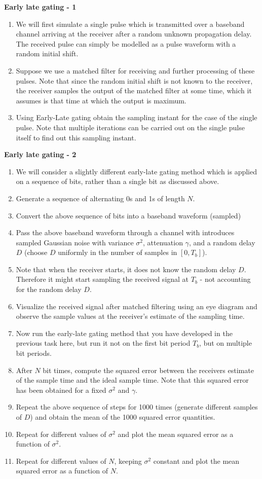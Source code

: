 \myhrule
\noindent
\textbf{Early late gating - 1}
\begin{enumerate}
\item We will first simulate a single pulse which is transmitted over a baseband channel arriving at the receiver after a random unknown propagation delay. The received pulse can simply be modelled as a pulse waveform with a random initial shift.
\item Suppose we use a matched filter for receiving and further processing of these pulses. Note that since the random initial shift is not known to the receiver, the receiver samples the output of the matched filter at some time, which it assumes is that time at which the output is maximum.
\item Using Early-Late gating obtain the sampling instant for the case of the single pulse. Note that multiple iterations can be carried out on the single pulse itself to find out this sampling instant.
\end{enumerate}

\myhrule
\noindent
\textbf{Early late gating - 2}
\begin{enumerate}
\item We will consider a slightly different early-late gating method which is applied on a sequence of bits, rather than a single bit as discussed above.
\item Generate a sequence of alternating 0s and 1s of length $N$.
\item Convert the above sequence of bits into a baseband waveform (sampled)
\item Pass the above baseband waveform through a channel with introduces sampled Gaussian noise with variance $\sigma^{2}$, attenuation $\gamma$, and a random delay $D$ (choose $D$ uniformly in the number of samples in $[0, T_{b}]$).
\item Note that when the receiver starts, it does not know the random delay $D$. Therefore it might start sampling the received signal at $T_{b}$ - not accounting for the random delay $D$. 
\item Visualize the received signal after matched filtering using an eye diagram and observe the sample values at the receiver's estimate of the sampling time.
\item Now run the early-late gating method that you have developed in the previous task here, but run it not on the first bit period $T_{b}$, but on multiple bit periods.
\item After $N$ bit times, compute the squared error between the receivers estimate of the sample time and the ideal sample time. Note that this squared error has been obtained for a fixed $\sigma^{2}$ and $\gamma$.
\item Repeat the above sequence of steps for 1000 times (generate different samples of $D$) and obtain the mean of the 1000 squared error quantities.
\item Repeat for different values of $\sigma^{2}$ and plot the mean squared error as a function of $\sigma^{2}$.
\item Repeat for different values of $N$, keeping $\sigma^{2}$ constant and plot the mean squared error as a function of $N$.
\end{enumerate}

